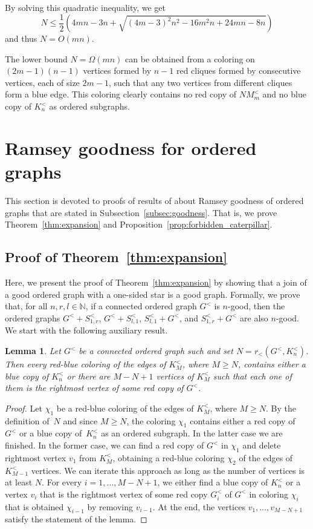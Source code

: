 \documentclass[11pt,a4paper]{article}
\newtheorem{lemma}[thm]{Lemma}
\theoremstyle{remark}
\begin{document}
By solving this quadratic inequality, we get 
\[N \leq \frac{1}{2}\left(4mn-3n + \sqrt{(4m-3)^2n^2-16m^2n+24mn-8n}\right)\]
and thus $N = O(mn)$. 

The lower bound $N = \Omega(mn)$ can be obtained from a coloring on $(2m-1)(n-1)$ vertices formed by $n-1$ red cliques formed by consecutive vertices, each of size $2m-1$, such that any two vertices from different cliques form a blue edge. This coloring clearly contains no red copy of $NM^<_m$ and no blue copy of $K^<_n$ as ordered subgraphs.




\section{Ramsey goodness for ordered graphs}

This section is devoted to proofs of results of about Ramsey goodness of ordered graphs that are stated in Subsection~\ref{subsec:goodness}.
That is, we prove Theorem~\ref{thm:expansion} and Proposition~\ref{prop:forbidden_caterpillar}.



\subsection{Proof of Theorem~\ref{thm:expansion}}

Here, we present the proof of Theorem~\ref{thm:expansion} by showing that a join of a good ordered graph with a one-sided star is a good graph.
Formally, we prove that, for all $n, r, l\in\mathbb{N}$, if a connected ordered graph $G^<$ is $n$-good, then the ordered graphs $G^< + S^<_{1,r}$, $G^< + S^<_{l,1}$, $S^<_{l,1}+G^<$, and $S^<_{1,r}+G^<$ are also $n$-good.
We start with the following auxiliary result.

\begin{lemma}
\label{lemma:copies}
Let $G^<$ be a connected ordered graph such and set $N = r_<(G^<,K^<_n)$.
Then every red-blue coloring of the edges of $K^<_M$, where $M \geq N$, contains either a blue copy of $K^<_n$ or there are $M-N+1$ vertices of $K^<_M$ such that each one of them is the rightmost vertex of some red copy of $G^<$.
\end{lemma}
\begin{proof}
Let $\chi_1$ be a red-blue coloring of the edges of $K^<_M$, where $M \geq N$.
By the definition of~$N$ and since $M \geq N$, the coloring $\chi_1$ contains either a red copy of $G^<$ or a blue copy of~$K^<_n$ as an ordered subgraph.
In the latter case we are finished.
In the former case, we can find a red copy of $G^<$ in $\chi_1$ and delete rightmost vertex $v_1$ from $K^<_M$, obtaining a red-blue coloring $\chi_2$ of the edges of $K^<_{M-1}$ vertices.
We can iterate this approach as long as the number of vertices is at least $N$.
For every $i=1,\dots,M-N+1$, we either find a blue copy of $K^<_n$ or a vertex $v_i$ that is the rightmost vertex of some red copy $G_i^<$ of $G^<$ in coloring $\chi_i$ that is obtained $\chi_{i-1}$ by removing $v_{i-1}$.
At the end, the vertices $v_1,\dots,v_{M-N+1}$ satisfy the statement of the lemma. 
\end{proof}
\end{document}
